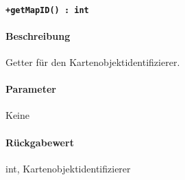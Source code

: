 \paragraph{\texttt{+getMapID() : int}}%
\paragraph*{Beschreibung}
Getter für den Kartenobjektidentifizierer.
\paragraph*{Parameter}
Keine
\paragraph*{Rückgabewert}
int, Kartenobjektidentifizierer